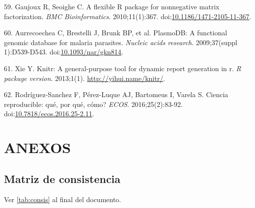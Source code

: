 \documentclass[a4paper]{article}
\begin{document}
\hypertarget{ref-Gaujoux2010NMF}{}
59. Gaujoux R, Seoighe C. A flexible R package for nonnegative matrix
factorization. \emph{BMC Bioinformatics}. 2010;11(1):367.
doi:\href{https://doi.org/10.1186/1471-2105-11-367}{10.1186/1471-2105-11-367}.

\hypertarget{ref-plasmodb}{}
60. Aurrecoechea C, Brestelli J, Brunk BP, et al. PlasmoDB: A functional
genomic database for malaria parasites. \emph{Nucleic acids research}.
2009;37(suppl 1):D539-D543.
doi:\href{https://doi.org/10.1093/nar/gkn814}{10.1093/nar/gkn814}.

\hypertarget{ref-knitr}{}
61. Xie Y. Knitr: A general-purpose tool for dynamic report generation
in r. \emph{R package version}. 2013;1(1).
\url{http://yihui.name/knitr/}.

\hypertarget{ref-CienciaReproducible2016}{}
62. Rodríguez-Sanchez F, Pérez-Luque AJ, Bartomeus I, Varela S. Ciencia
reproducible: qué, por qué, cómo? \emph{ECOS}. 2016;25(2):83-92.
doi:\href{https://doi.org/10.7818/ecos.2016.25-2.11}{10.7818/ecos.2016.25-2.11}.

\section{ANEXOS}\label{anexos}

\subsection{Matriz de consistencia}\label{matriz-de-consistencia}

Ver \autoref{tab:consis} al final del documento.
\end{document}
